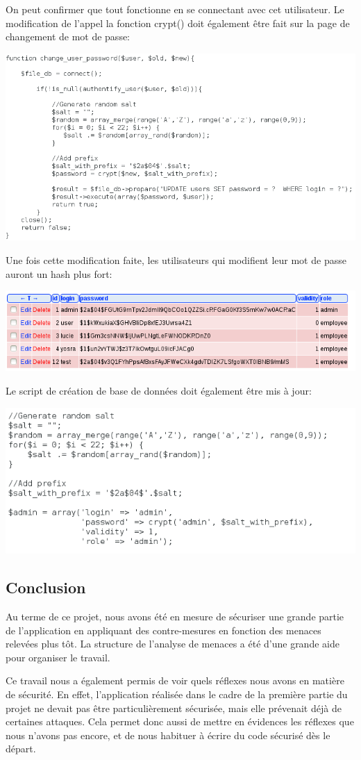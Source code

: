 \documentclass{article}
\begin{document}
On peut confirmer que tout fonctionne en se connectant avec cet
utilisateur. Le modification de l'appel la fonction crypt() doit
également être fait sur la page de changement de mot de passe:

\includegraphics{images/crypt_apres3.PNG}

Une fois cette modification faite, les utilisateurs qui modifient leur
mot de passe auront un hash plus fort:

\includegraphics{images/crypt_apres4.PNG}

Le script de création de base de données doit également être mis à jour:

\includegraphics{images/crypt_apres5.PNG}

\subsection{Conclusion}

Au terme de ce projet, nous avons été en mesure de sécuriser une grande
partie de l'application en appliquant des contre-mesures en fonction des
menaces relevées plus tôt. La structure de l'analyse de menaces a été
d'une grande aide pour organiser le travail.

Ce travail nous a également permis de voir quels réflexes nous avons en
matière de sécurité. En effet, l'application réalisée dans le cadre de
la première partie du projet ne devait pas être particulièrement
sécurisée, mais elle prévenait déjà de certaines attaques. Cela permet
donc aussi de mettre en évidences les réflexes que nous n'avons pas
encore, et de nous habituer à écrire du code sécurisé dès le départ.
\end{document}
